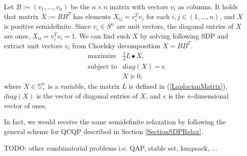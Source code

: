 \documentclass[12pt]{book}
\theoremstyle{definition}
\begin{document}
Let $B := (v_1,\dots ,v_n)$ be the $n\times n$ matrix with vectors $v_i$ as columns. 
It holds that matrix $X:= BB^T$ has elements $ X_{ij} = v_i^Tv_j $ for each $i,j\in (1,\dots,n)$, and $X$ is positive semidefinite.
Since $v_i\in S^n$ are unit vectors, the diagonal entries of $X$ are ones, $X_{ii} = v_i^Tv_i = 1$.
We can find such $X$ by solving following SDP and extract unit vectors $v_i$ from Choelsky decomposition $X = BB^T$.
\begin{equation}
\begin{array}{ll}
\mbox{maximize} & \frac{1}{4}L\bullet X, \\
\mbox{subject to} & diag(X) = e \\
&	X\succeq 0,
\end{array}
\end{equation} 
where $X\in\mathbb{S}^n_+$ is a variable, the matrix $L$ is defined in (\ref{LaplacianMatrix}), $diag(X)$ is the vector of diagonal entries of $X$, and $e$ is the $n$-dimensional vector of ones.

\rem In fact, we would receive the same semidefinite relaxation by following the general scheme for QCQP described in Section \ref{SectionSDPRelax}.




TODO: other combinatorial problems i.e. QAP, stable set, knapsack, ...
\end{document}

